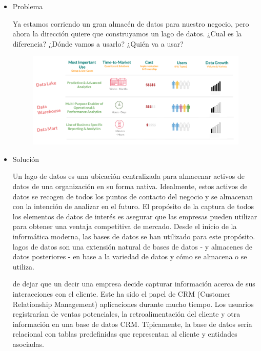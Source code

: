 \documentclass[preprint,12pt]{elsarticle}
\begin{document}
\begin{itemize}

\item Problema

Ya estamos corriendo un gran almacén de datos para nuestro negocio, pero ahora la dirección quiere que construyamos un lago de datos. ¿Cual es la diferencia? ¿Dónde vamos a usarlo? ¿Quién va a usar?

\begin{figure}[htb]
				\begin{center}
					\includegraphics[width=15cm]{./IMAGENES/fiorella5}
				\end{center}
			\end{figure}

\item Solución

Un lago de datos es una ubicación centralizada para almacenar activos de datos de una organización en su forma nativa. Idealmente, estos activos de datos se recogen de todos los puntos de contacto del negocio y se almacenan con la intención de analizar en el futuro. El propósito de la captura de todos los elementos de datos de interés es asegurar que las empresas pueden utilizar para obtener una ventaja competitiva de mercado. Desde el inicio de la informática moderna, las bases de datos se han utilizado para este propósito. lagos de datos son una extensión natural de bases de datos - y almacenes de datos posteriores - en base a la variedad de datos y cómo se almacena o se utiliza.

de dejar que un decir una empresa decide capturar información acerca de sus interacciones con el cliente. Este ha sido el papel de CRM (Customer Relationship Management) aplicaciones durante mucho tiempo. Los usuarios registrarían de ventas potenciales, la retroalimentación del cliente y otra información en una base de datos CRM. Típicamente, la base de datos sería relacional con tablas predefinidas que representan al cliente y entidades asociadas.


\end{itemize}
\end{document}
